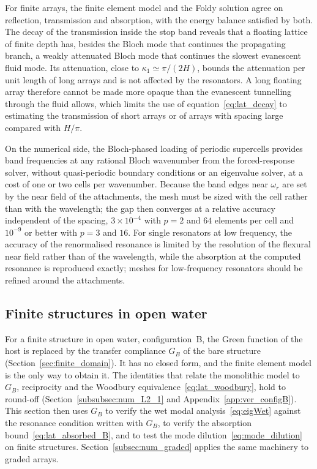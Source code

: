 {For finite arrays, the finite element model and the Foldy solution agree on reflection, transmission and absorption, with the energy balance satisfied by both. The decay of the transmission inside the stop band reveals that a floating lattice of finite depth has, besides the Bloch mode that continues the propagating branch, a weakly attenuated Bloch mode that continues the slowest evanescent fluid mode. Its attenuation, close to $\kappa_1\simeq\pi/(2H)$, bounds the attenuation per unit length of long arrays and is not affected by the resonators. A long floating array therefore cannot be made more opaque than the evanescent tunnelling through the fluid allows, which limits the use of equation~\eqref{eq:lat_decay} to estimating the transmission of short arrays or of arrays with spacing large compared with $H/\pi$.

On the numerical side, the Bloch-phased loading of periodic supercells provides band frequencies at any rational Bloch wavenumber from the forced-response solver, without quasi-periodic boundary conditions or an eigenvalue solver, at a cost of one or two cells per wavenumber. Because the band edges near $\omega_r$ are set by the near field of the attachments, the mesh must be sized with the cell rather than with the wavelength; the gap then converges at a relative accuracy independent of the spacing, $3\times10^{-4}$ with $p=2$ and $64$ elements per cell and $10^{-9}$ or better with $p=3$ and $16$. For single resonators at low frequency, the accuracy of the renormalised resonance is limited by the resolution of the flexural near field rather than of the wavelength, while the absorption at the computed resonance is reproduced exactly; meshes for low-frequency resonators should be refined around the attachments.

\subsection{Finite structures in open water}\label{subsec:num_configB}

For a finite structure in open water, configuration~B, the Green function of the host is replaced by the transfer compliance $G_B$ of the bare structure (Section~\ref{sec:finite_domain}). It has no closed form, and the finite element model is the only way to obtain it. The identities that relate the monolithic model to $G_B$, reciprocity and the Woodbury equivalence~\eqref{eq:lat_woodbury}, hold to round-off (Section~\ref{subsubsec:num_L2_1} and Appendix~\ref{app:ver_configB}). This section then uses $G_B$ to verify the wet modal analysis~\eqref{eq:eigWet} against the resonance condition written with $G_B$, to verify the absorption bound~\eqref{eq:lat_absorbed_B}, and to test the mode dilution~\eqref{eq:mode_dilution} on finite structures. Section~\ref{subsec:num_graded} applies the same machinery to graded arrays.


}
